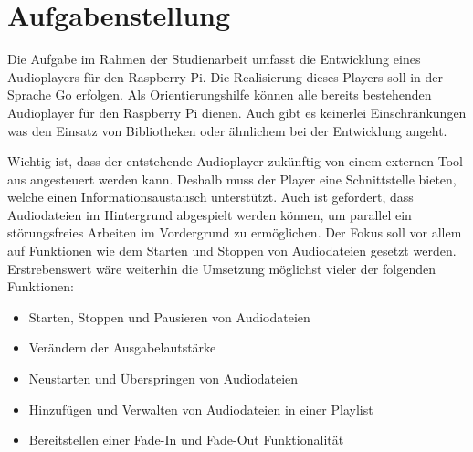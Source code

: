 
\chapter{Aufgabenstellung}
Die Aufgabe im Rahmen der Studienarbeit umfasst die Entwicklung eines
Audioplayers für den Raspberry Pi. Die Realisierung dieses Players soll in der
Sprache Go erfolgen. Als Orientierungshilfe können alle bereits bestehenden Audioplayer
für den Raspberry Pi dienen. Auch gibt es keinerlei Einschränkungen was den
Einsatz von Bibliotheken oder ähnlichem bei der Entwicklung angeht. \hfill
\break

Wichtig ist, dass der entstehende Audioplayer zukünftig von einem externen Tool
aus angesteuert werden kann. Deshalb muss der Player eine Schnittstelle bieten,
welche einen Informationsaustausch unterstützt. Auch ist gefordert, dass
Audiodateien im Hintergrund abgespielt werden können, um parallel ein
störungsfreies Arbeiten im Vordergrund zu ermöglichen. \hfill \break
Der Fokus soll vor allem auf Funktionen wie dem Starten und Stoppen von
Audiodateien gesetzt werden. Erstrebenswert wäre weiterhin die Umsetzung
möglichst vieler der folgenden Funktionen: 

\begin{itemize}
\item Starten, Stoppen und Pausieren von Audiodateien
\item Verändern der Ausgabelautstärke
\item Neustarten und Überspringen von Audiodateien
\item Hinzufügen und Verwalten von Audiodateien in einer Playlist 
\item Bereitstellen einer Fade-In und Fade-Out Funktionalität 
\end{itemize}

